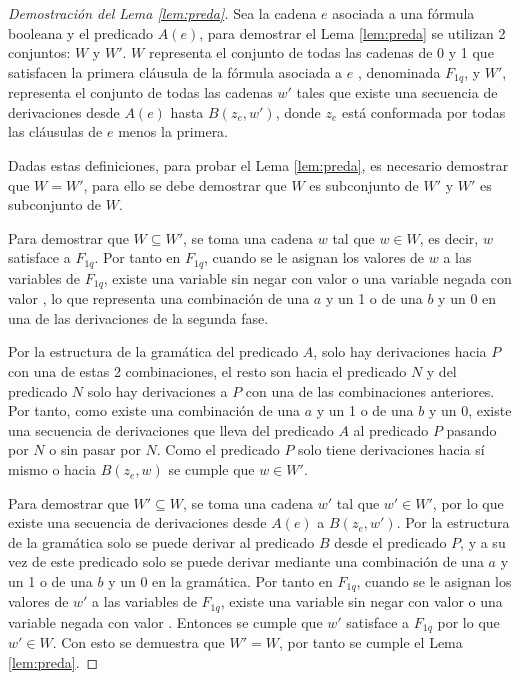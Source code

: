 \begin{proof}[Demostración del Lema \ref{lem:preda}]
    
    Sea la cadena $e$ asociada a una fórmula booleana y el predicado $A(e)$, para demostrar el Lema \ref{lem:preda} se utilizan 2 conjuntos: $W$ y $W'$. $W$ representa el conjunto de todas las cadenas de 0 y 1 que satisfacen la primera cláusula de la fórmula asociada a $e$ , denominada $F_{1q}$, y $W'$, representa el conjunto de todas las cadenas $w'$ tales que existe una secuencia de derivaciones desde $A(e)$ hasta $B(z_e,w')$, donde $z_e$ está conformada por todas las cláusulas de $e$ menos la primera.
    
    Dadas estas definiciones, para probar el Lema \ref{lem:preda}, es necesario demostrar que $W=W'$, para ello se debe demostrar que $W$ es subconjunto de $W'$ y $W'$ es subconjunto de $W$. 
    
    Para demostrar que $W\subseteq W'$, se toma una cadena $w$ tal que $w\in W$, es decir, $w$ satisface a $F_{1q}$. 
    Por tanto en $F_{1q}$, cuando se le asignan los valores de $w$ a las variables de $F_{1q}$, existe una variable 
    sin negar con valor \true{} o una variable negada con valor \false{}, lo que representa una combinación de una $a$ y un 1 o de una $b$ y un 0 en una de las derivaciones de la segunda fase.
    
    Por la estructura de la gramática del predicado $A$, solo hay derivaciones hacia $P$ con una de estas 2 combinaciones, el resto son hacia el predicado $N$ y del predicado $N$ solo hay derivaciones a $P$ con una de las combinaciones anteriores. Por tanto, como existe una combinación de una $a$ y un 1 o de una $b$ y un 0, existe una secuencia de derivaciones que lleva del predicado $A$ al predicado $P$ pasando por $N$ o sin pasar por $N$. Como el predicado $P$ solo tiene derivaciones hacia sí mismo o hacia $B(z_e,w)$ se cumple que $w\in W'$.
    
    Para demostrar que $W'\subseteq W$, se toma una cadena $w'$ tal que $w'\in W'$, por lo que existe una secuencia de derivaciones desde $A(e)$ a $B(z_e,w')$. Por la estructura de la gramática solo se puede derivar al predicado $B$ desde el predicado $P$, y a su vez de este predicado solo se puede derivar mediante una combinación de una $a$ y un 1 o de una $b$ y un 0 en la gramática. Por tanto en $F_{1q}$, cuando se le asignan los valores de $w'$ a las variables de $F_{1q}$, existe una variable 
    sin negar con valor \true{} o una variable negada con valor \false{}.  Entonces se cumple que $w'$ satisface a $F_{1q}$ por lo que $w'\in W$. Con esto se demuestra que $W'=W$, por tanto se cumple el Lema \ref{lem:preda}.
\end{proof}

